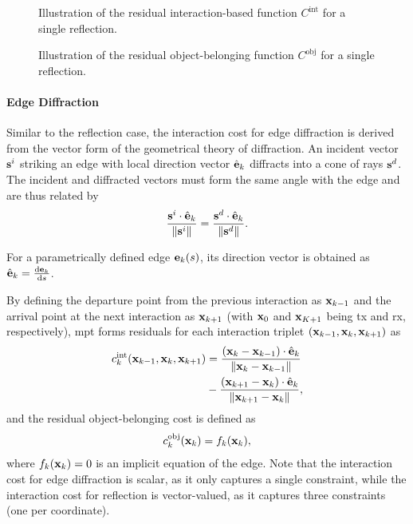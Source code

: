 \begin{figure}
  \caption{Illustration of the residual interaction-based function $C^\mathrm{int}$ for a single reflection.}
\end{figure}

\begin{figure}
  \caption{Illustration of the residual object-belonging function $C^\mathrm{obj}$ for a single reflection.}
\end{figure}

\paragraph{Edge Diffraction}

Similar to the reflection case, the interaction cost for edge diffraction is derived from the vector form of the geometrical theory of diffraction. An incident vector $\mathbf{s}^i$ striking an edge with local direction vector $\hat{\mathbf{e}}_k$ diffracts into a cone of rays $\mathbf{s}^d$. The incident and diffracted vectors must form the same angle with the edge and are thus related by
\begin{equation}
  \frac{\mathbf{s}^i \cdot \hat{\mathbf{e}}_k}{\| \mathbf{s}^i \|} =  \frac{\mathbf{s}^d \cdot \hat{\mathbf{e}}_k}{\|\mathbf{s}^d\|}.
\end{equation}

For a parametrically defined edge $\mathbf{e}_k(s)$, its direction vector is obtained as $\hat{\mathbf{e}}_k = \tfrac{\mathrm{d}\mathbf{e}_k}{\mathrm{d}s}$.

By defining the departure point from the previous interaction as $\mathbf{x}_{k-1}$ and the arrival point at the next interaction as $\mathbf{x}_{k+1}$ (with $\mathbf{x}_0$ and $\mathbf{x}_{K+1}$ being \gls{tx} and \gls{rx}, respectively), \gls{mpt} forms residuals for each interaction triplet $(\mathbf{x}_{k-1}, \mathbf{x}_k, \mathbf{x}_{k+1})$ as
\begin{equation}
  \begin{split}
    c_k^{\mathrm{int}}(\mathbf{x}_{k-1}, \mathbf{x}_k, \mathbf{x}_{k+1}) &=
    \frac{\left(\mathbf{x}_{k} - \mathbf{x}_{k-1}\right) \cdot \hat{\mathbf{e}}_k}{\| \mathbf{x}_{k} - \mathbf{x}_{k-1} \|} \\
    &-\frac{\left(\mathbf{x}_{k+1} - \mathbf{x}_k\right) \cdot \hat{\mathbf{e}}_k}{\|\mathbf{x}_{k+1} - \mathbf{x}_k \|},
  \end{split}
\end{equation}
and the residual object-belonging cost is defined as
\begin{equation}
  c_k^{\mathrm{obj}}(\mathbf{x}_k) = f_k(\mathbf{x}_k),
\end{equation}
where $f_k(\mathbf{x}_k)=0$ is an implicit equation of the edge. Note that the interaction cost for edge diffraction is scalar, as it only captures a single constraint, while the interaction cost for reflection is vector-valued, as it captures three constraints (one per coordinate).

